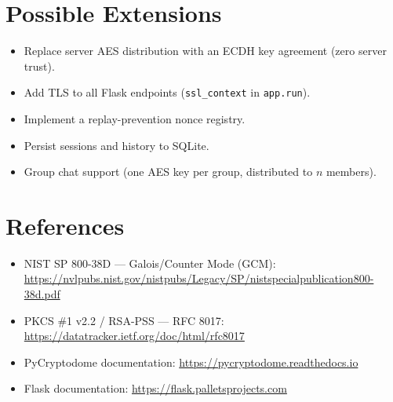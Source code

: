 \documentclass[12pt,a4paper]{article}
\begin{document}
\section{Possible Extensions}

\begin{itemize}[noitemsep]
  \item Replace server AES distribution with an ECDH key agreement (zero server trust).
  \item Add TLS to all Flask endpoints (\texttt{ssl\_context} in \texttt{app.run}).
  \item Implement a replay-prevention nonce registry.
  \item Persist sessions and history to SQLite.
  \item Group chat support (one AES key per group, distributed to \(n\) members).
\end{itemize}

\section{References}

\begin{itemize}[noitemsep]
  \item NIST SP 800-38D --- Galois/Counter Mode (GCM): \url{https://nvlpubs.nist.gov/nistpubs/Legacy/SP/nistspecialpublication800-38d.pdf}
  \item PKCS \#1 v2.2 / RSA-PSS --- RFC 8017: \url{https://datatracker.ietf.org/doc/html/rfc8017}
  \item PyCryptodome documentation: \url{https://pycryptodome.readthedocs.io}
  \item Flask documentation: \url{https://flask.palletsprojects.com}
\end{itemize}
\end{document}
